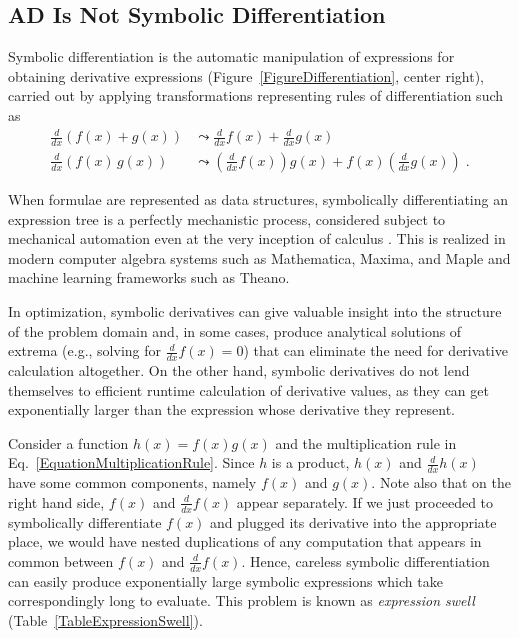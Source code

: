\documentclass[twoside,11pt]{article}
\begin{document}
\subsection{AD Is Not Symbolic Differentiation}

Symbolic differentiation is the automatic manipulation of expressions for obtaining derivative expressions \citep{Grabmeier2003} (Figure~\ref{FigureDifferentiation}, center right), carried out by applying transformations representing rules of differentiation such as
\begin{equation}
\begin{aligned}
\frac{d}{dx} \left(f(x) + g(x)\right) &\leadsto \frac{d}{dx} f(x) + \frac{d}{dx} g(x)\\
\frac{d}{dx} \left(f(x)\,g(x)\right) &\leadsto \left(\frac{d}{dx} f(x)\right) g(x) + f(x) \left(\frac{d}{dx} g(x)\right)\; .
\end{aligned}
\label{EquationMultiplicationRule}
\end{equation}

When formulae are represented as data structures, symbolically differentiating an expression tree is a perfectly mechanistic process, considered subject to mechanical automation even at the very inception of calculus \citep{Leibniz1685}. This is realized in modern computer algebra systems such as Mathematica, Maxima, and Maple and machine learning frameworks such as Theano.

In optimization, symbolic derivatives can give valuable insight into the structure of the problem domain and, in some cases, produce analytical solutions of extrema (e.g., solving for $\frac{d}{dx}f(x)=0$) that can eliminate the need for derivative calculation altogether. On the other hand, symbolic derivatives do not lend themselves to efficient runtime calculation of derivative values, as they can get exponentially larger than the expression whose derivative they represent.

Consider a function $h(x)=f(x)g(x)$ and the multiplication rule in Eq.~\ref{EquationMultiplicationRule}. Since $h$ is a product, $h(x)$ and $\frac{d}{dx}h(x)$ have some common components, namely $f(x)$ and $g(x)$. Note also that on the right hand side, $f(x)$ and $\frac{d}{dx}f(x)$ appear separately. If we just proceeded to symbolically differentiate $f(x)$ and plugged its derivative into the appropriate place, we would have nested duplications of any computation that appears in common between $f(x)$ and $\frac{d}{dx}f(x)$. Hence, careless symbolic differentiation can easily produce exponentially large symbolic expressions which take correspondingly long to evaluate. This problem is known as \emph{expression swell} (Table~\ref{TableExpressionSwell}).
\end{document}
